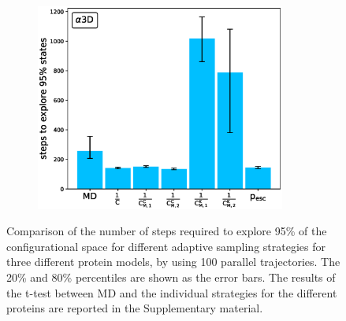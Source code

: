 \begin{figure}[H]
\begin{subfigure}[t]{0.5\textwidth}
    \includegraphics[width=0.9\textwidth]{figures/A3D_7_steps10000_nparallel100_explore.eps}
  \end{subfigure}
  \caption{Comparison of the number of steps required to explore 95\% of the
  configurational space for different adaptive sampling strategies for three
  different protein models, by using 100 parallel trajectories. The 20\% and
  80\% percentiles are shown as the error bars.
  The results of the t-test between MD and the
  individual strategies for the different proteins are reported in the Supplementary material.}
  \label{fig:Time_explore}
\end{figure}


